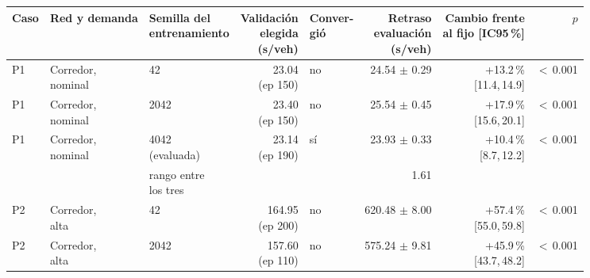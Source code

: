 \begin{table}[H]
\centering
\scriptsize
\setlength{\tabcolsep}{3pt}
\begin{tabular}{lllrlrrr}
\toprule
Caso & Red y demanda & \makecell{Semilla del\\entrenamiento} & \makecell{Validación\\elegida\\(s/veh)} & \makecell{Conver-\\gió} & \makecell{Retraso\\evaluación\\(s/veh)} & \makecell{Cambio frente\\al fijo [IC95\,\%]} & $p$ \\
\midrule
P1 & \makecell[l]{Corredor,\\{}nominal} & 42 & \makecell[r]{23.04\\{}(ep 150)} & no & \makecell[r]{24.54\\{}$\pm$ 0.29} & \makecell[r]{+13.2\,\%\\{}[11.4,\,14.9]} & $<$\,0.001 \\
P1 & \makecell[l]{Corredor,\\{}nominal} & 2042 & \makecell[r]{23.40\\{}(ep 150)} & no & \makecell[r]{25.54\\{}$\pm$ 0.45} & \makecell[r]{+17.9\,\%\\{}[15.6,\,20.1]} & $<$\,0.001 \\
P1 & \makecell[l]{Corredor,\\{}nominal} & \makecell[l]{4042\\{}(evaluada)} & \makecell[r]{23.14\\{}(ep 190)} & sí & \makecell[r]{23.93\\{}$\pm$ 0.33} & \makecell[r]{+10.4\,\%\\{}[8.7,\,12.2]} & $<$\,0.001 \\
 & & \makecell[l]{rango entre\\{}los tres} & & & 1.61 & & \\
P2 & \makecell[l]{Corredor,\\{}alta} & 42 & \makecell[r]{164.95\\{}(ep 200)} & no & \makecell[r]{620.48\\{}$\pm$ 8.00} & \makecell[r]{+57.4\,\%\\{}[55.0,\,59.8]} & $<$\,0.001 \\
P2 & \makecell[l]{Corredor,\\{}alta} & 2042 & \makecell[r]{157.60\\{}(ep 110)} & no & \makecell[r]{575.24\\{}$\pm$ 9.81} & \makecell[r]{+45.9\,\%\\{}[43.7,\,48.2]} & $<$\,0.001 \\

\end{tabular}
\end{table}
